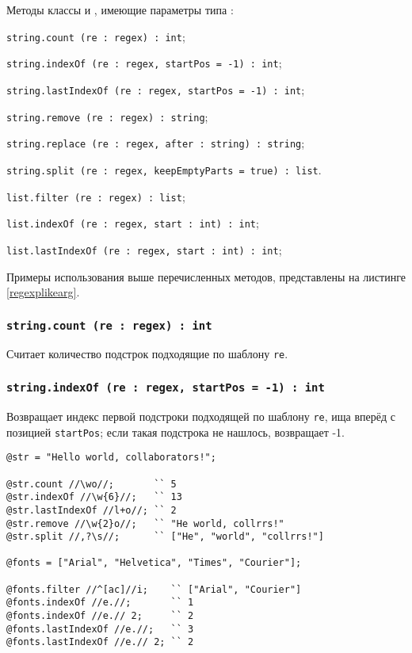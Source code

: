 Методы классы \str{} и \listtype, имеющие параметры типа \regex{}:
\begin{icItems}
\item
	\texttt{string.count (re : regex) : int};
\item
	\texttt{string.indexOf (re : regex, startPos = -1) : int};
\item
	\texttt{string.lastIndexOf (re : regex, startPos = -1) : int};
\item
	\texttt{string.remove (re : regex) : string};
\item 
	\texttt{string.replace (re : regex, after : string) : string};
\item
	\texttt{string.split (re : regex, keepEmptyParts = true) : list}.
\item
	\texttt{list.filter (re : regex) : list};
\item
	\texttt{list.indexOf (re : regex, start : int) : int};
\item
	\texttt{list.lastIndexOf (re : regex, start : int) : int};
\end{icItems}

Примеры использования выше перечисленных методов, представлены на листинге \ref{regexplikearg}.

\subsubsection{\texttt{string.count (re : regex) : int}}

Считает количество подстрок подходящие по шаблону \texttt{re}.

\subsubsection{\texttt{string.indexOf (re : regex, startPos = -1) : int}}

Возвращает индекс первой подстроки подходящей по шаблону \texttt{re}, ища вперёд с позицией \texttt{startPos}; если такая подстрока не нашлось, возвращает -1.

\begin{sourcecode}
\label{regexplikearg}
\begin{verbatim}
@str = "Hello world, collaborators!";

@str.count //\wo//;       `` 5
@str.indexOf //\w{6}//;   `` 13
@str.lastIndexOf //l+o//; `` 2
@str.remove //\w{2}o//;   `` "He world, collrrs!"
@str.split //,?\s//;      `` ["He", "world", "collrrs!"]

@fonts = ["Arial", "Helvetica", "Times", "Courier"];

@fonts.filter //^[ac]//i;    `` ["Arial", "Courier"]
@fonts.indexOf //e.//;       `` 1
@fonts.indexOf //e.// 2;     `` 2
@fonts.lastIndexOf //e.//;   `` 3
@fonts.lastIndexOf //e.// 2; `` 2
\end{verbatim}
\end{sourcecode}

